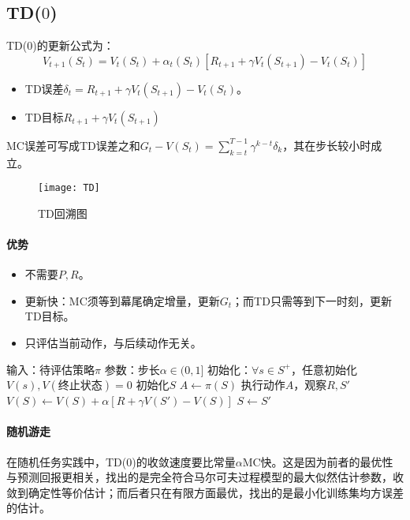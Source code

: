 \documentclass[
12pt, %
a4paper, 
oneside, %
headinclude,footinclude, %
]{scrartcl}
\begin{document}
\subsection{TD($ 0 $)}
TD($ 0 $)的更新公式为：
$$ V_{t + 1}(S_t) = V_t(S_t) + \alpha_t(S_t)[R_{t + 1} + \gamma V_t(S_{t + 1}) - V_t(S_t)] $$
\begin{itemize}
\item TD误差$ \delta_t = R_{t + 1} + \gamma V_t(S_{t + 1}) - V_t(S_t) $。
\item TD目标$ R_{t + 1} + \gamma V_t(S_{t + 1}) $
\end{itemize}

MC误差可写成TD误差之和$ G_t - V(S_t) = \sum_{k = t}^{T - 1} \gamma^{k - t} \delta_k $，其在步长较小时成立。

\begin{figure}[H]
\centering
\texttt{[image: TD]}
\caption[TD回溯图]{TD回溯图}
\end{figure}
\paragraph{优势}
\begin{itemize}
\item 不需要$ P,R $。
\item 更新快：MC须等到幕尾确定增量，更新$ G_t $；而TD只需等到下一时刻，更新TD目标。
\item 只评估当前动作，与后续动作无关。
\end{itemize}
\begin{myalgorithm}[TD($ 0 $)]
\State 输入：待评估策略$ \pi $
\State 参数：步长$ \alpha \in (0,1] $
\State 初始化：$ \forall s \in S^+ $，任意初始化$ V(s), V(\text{终止状态}) = 0 $
\State 初始化$ S $
\State $ A \gets \pi(S) $
\State 执行动作$ A $，观察$ R, S' $
\State $ V(S) \gets V(S) + \alpha[R + \gamma V(S') - V(S)] $
\State $ S \gets S' $
\EndWhile
\EndFor
\end{myalgorithm}
\paragraph{随机游走}
在随机任务实践中，TD($ 0 $)的收敛速度要比常量$ \alpha $MC快。这是因为前者的最优性与预测回报更相关，找出的是完全符合马尔可夫过程模型的最大似然估计参数，收敛到确定性等价估计；而后者只在有限方面最优，找出的是最小化训练集均方误差的估计。
\end{document}

